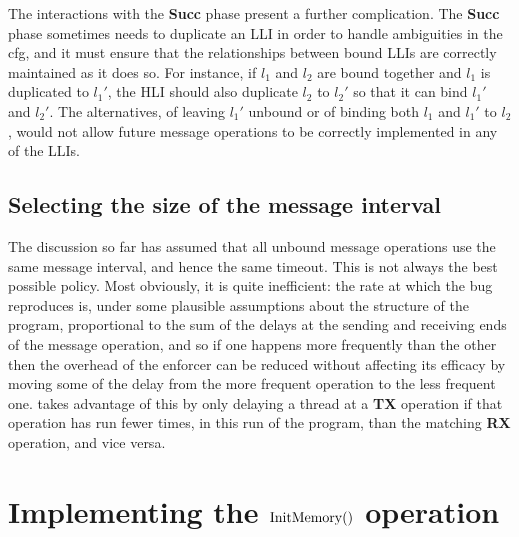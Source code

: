 The interactions with the \textbf{Succ} phase present a further
complication.  The \textbf{Succ} phase sometimes needs to duplicate an
LLI in order to handle ambiguities in the \gls{cfg}, and it must
ensure that the relationships between bound LLIs are correctly
maintained as it does so.  For instance, if $l_1$ and $l_2$ are bound
together and $l_1$ is duplicated to $l_1'$, the HLI should also
duplicate $l_2$ to $l_2'$ so that it can bind $l_1'$ and $l_2'$.  The
alternatives, of leaving $l_1'$ unbound or of binding both $l_1$ and
$l_1'$ to $l_2$, would not allow future message operations to be
correctly implemented in any of the LLIs.

\subsection{Selecting the size of the message interval}
\label{sect:using:timeout_balancing}


The discussion so far has assumed that all unbound message operations
use the same message interval, and hence the same timeout.  This is
not always the best possible policy.  Most obviously, it is quite
inefficient: the rate at which the bug reproduces is, under some
plausible assumptions about the structure of the program, proportional
to the sum of the delays at the sending and receiving ends of the
message operation, and so if one happens more frequently than the
other then the overhead of the enforcer can be reduced without
affecting its efficacy by moving some of the delay from the more
frequent operation to the less frequent one.  {\Implementation} takes
advantage of this by only delaying a thread at a \textbf{TX} operation
if that operation has run fewer times, in this run of the program,
than the matching \textbf{RX} operation, and vice versa.

\section{Implementing the $\mathrm{InitMemory}()$ operation}

